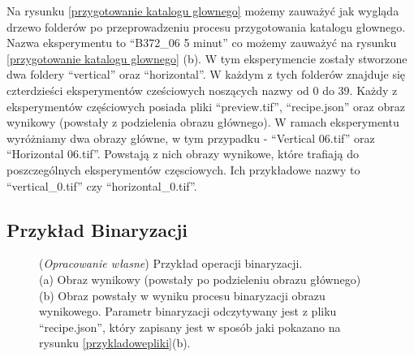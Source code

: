 \documentclass{article}
\begin{document}
    {
        \label{przygotowaniekataloguglownego}
        \Large
        \justifying
        \quad
        Na rysunku \ref{przygotowanie katalogu glownego} możemy zauważyć jak wygląda drzewo folderów po przeprowadzeniu procesu przygotowania katalogu głownego.
        Nazwa eksperymentu to ``B372\_06 5 minut'' co możemy zauważyć na rysunku \ref{przygotowanie katalogu glownego} (b).
        W tym eksperymencie zostały stworzone dwa foldery ``vertical'' oraz ``horizontal''.
        W każdym z tych folderów znajduje się czterdzieści eksperymentów cześciowych noszących nazwy od 0 do 39.
        Każdy z eksperymentów częściowych posiada pliki ``preview.tif'', ``recipe.json'' oraz obraz wynikowy (powstały z podzielenia obrazu głównego).
        W ramach eksperymentu wyróżniamy dwa obrazy główne, w tym przypadku - ``Vertical 06.tif'' oraz ``Horizontal 06.tif''.
        Powstają z nich obrazy wynikowe, które trafiają do poszczególnych eksperymentów częsciowych.
        Ich przykładowe nazwy to ``vertical\_0.tif'' czy ``horizontal\_0.tif''.
    }
    \subsection{Przykład Binaryzacji}
    \begin{figure}[H]
        \centering
        \qquad
        \caption
        {
            (\textit{Opracowanie własne}) Przykład operacji binaryzacji.\\
            (a) Obraz wynikowy (powstały po podzieleniu obrazu głównego)\\
            (b) Obraz powstały w wyniku procesu binaryzacji obrazu wynikowego.
            Parametr binaryzacji odczytywany jest z pliku ``recipe.json'', który zapisany jest w sposób jaki pokazano na rysunku \ref{przykladowepliki}(b).
        }
    \end{figure}
\end{document}
